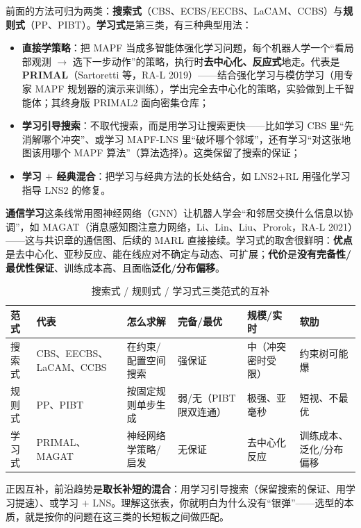 前面的方法可归为两类：\textbf{搜索式}（CBS、ECBS/EECBS、LaCAM、CCBS）与\textbf{规则式}（PP、PIBT）。\textbf{学习式}是第三类，有三种典型用法：

\begin{itemize}
  \item \textbf{直接学策略}：把 MAPF 当成多智能体强化学习问题，每个机器人学一个“看局部观测 $\to$ 选下一步动作”的策略，执行时\textbf{去中心化、反应式}地走。代表是 \textbf{PRIMAL}（Sartoretti 等，RA-L 2019）\cite{sartoretti2019primal}——结合强化学习与模仿学习（用专家 MAPF 规划器的演示来训练），学出完全去中心化的策略，实验做到上千智能体；其终身版 PRIMAL2 面向密集仓库；
  \item \textbf{学习引导搜索}：不取代搜索，而是用学习让搜索更快——比如学习 CBS 里“先消解哪个冲突”、或学习 MAPF-LNS 里“破坏哪个邻域”\cite{huang2022learning}，还有学习“对这张地图该用哪个 MAPF 算法”（算法选择）。这类保留了搜索的保证；
  \item \textbf{学习 $+$ 经典混合}：把学习与经典方法的长处结合，如 LNS2$+$RL 用强化学习指导 LNS2 的修复。
\end{itemize}

\textbf{通信学习}这条线常用图神经网络（GNN）让机器人学会“和邻居交换什么信息以协调”，如 MAGAT（消息感知图注意力网络，Li、Lin、Liu、Prorok，RA-L 2021）\cite{li2021magat}——这与共识章的通信图、后续的 MARL 直接接续。学习式的取舍很鲜明：\textbf{优点}是去中心化、亚秒反应、能在线应对不确定与动态、可扩展；\textbf{代价}是\textbf{没有完备性/最优性保证}、训练成本高、且面临\textbf{泛化/分布偏移}。

\begin{table}[H]\centering\small
\caption{搜索式 / 规则式 / 学习式三类范式的互补}
\label{tab:mapf-paradigms}
\begin{tabular}{llllll}
\toprule
范式 & 代表 & 怎么求解 & 完备/最优 & 规模/实时 & 软肋 \\
\midrule
搜索式 & CBS、EECBS、LaCAM、CCBS & 在约束/配置空间搜索 & 强保证 & 中（冲突密时受限） & 约束树可能爆 \\
规则式 & PP、PIBT & 按固定规则单步生成 & 弱/无（PIBT 限双连通） & 极强、亚毫秒 & 短视、不最优 \\
学习式 & PRIMAL、MAGAT & 神经网络学策略/启发 & 无保证 & 去中心化反应 & 训练成本、泛化/分布偏移 \\
\bottomrule
\end{tabular}
\end{table}

正因互补，前沿趋势是\textbf{取长补短的混合}：用学习引导搜索（保留搜索的保证、用学习提速）、或学习 $+$ LNS。理解这张表，你就明白为什么没有“银弹”——选型的本质，就是按你的问题在这三类的长短板之间做匹配。

